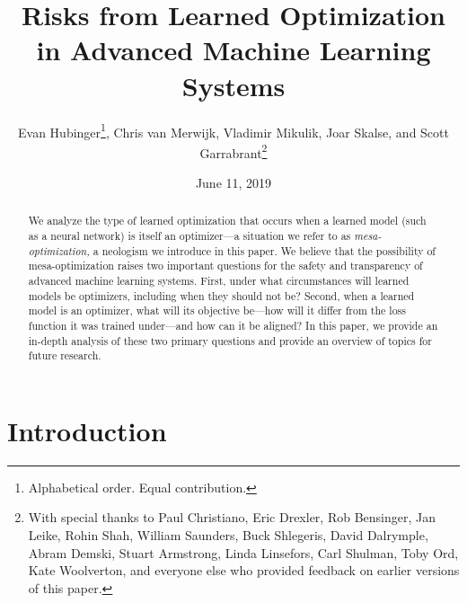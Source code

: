 \documentclass[
  onecolumn,
  natbib,
]{miri-tech-article}
\begin{document}
\title{Risks from Learned Optimization \\ in Advanced Machine Learning Systems}
\author{Evan Hubinger\thanks{Alphabetical order. Equal contribution.}, Chris van Merwijk\footnotemark[1], Vladimir Mikulik\footnotemark[1], Joar Skalse\footnotemark[1], and Scott Garrabrant\thanks{With special thanks to Paul Christiano, Eric Drexler, Rob Bensinger, Jan Leike, Rohin Shah, William Saunders, Buck Shlegeris, David Dalrymple, Abram Demski, Stuart Armstrong, Linda Linsefors, Carl Shulman, Toby Ord, Kate Woolverton, and everyone else who provided feedback on earlier versions of this paper.}}

\date{June 11, 2019}


\maketitle

\begin{abstract}
We analyze the type of learned optimization that occurs when a learned model (such as a neural network) is itself an optimizer---a situation we refer to as \textit{mesa-optimization,} a neologism we introduce in this paper. We believe that the possibility of mesa-optimization raises two important questions for the safety and transparency of advanced machine learning systems. First, under what circumstances will learned models be optimizers, including when they should not be? Second, when a learned model is an optimizer, what will its objective be---how will it differ from the loss function it was trained under---and how can it be aligned? In this paper, we provide an in-depth analysis of these two primary questions and provide an overview of topics for future research.
\end{abstract}

\tableofcontents

\section{Introduction}
\label{sec:1}
\end{document}
